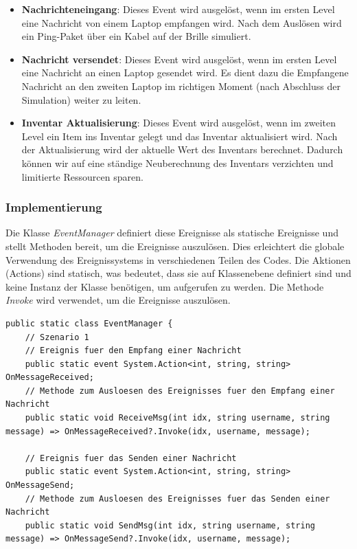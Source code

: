 \begin{itemize}
\begin{itemize}
    \item \textbf{Nachrichteneingang}: Dieses Event wird ausgelöst, wenn im ersten Level eine Nachricht von einem Laptop
    empfangen wird. Nach dem Auslösen wird ein Ping-Paket über ein Kabel auf der Brille simuliert.
    \item \textbf{Nachricht versendet}: Dieses Event wird ausgelöst, wenn im ersten Level eine Nachricht an einen Laptop
    gesendet wird. Es dient dazu die Empfangene Nachricht an den zweiten Laptop im richtigen Moment (nach Abschluss der
    Simulation) weiter zu leiten.
    \item \textbf{Inventar Aktualisierung}: Dieses Event wird ausgelöst, wenn im zweiten Level ein Item ins Inventar gelegt und
    das Inventar aktualisiert wird. Nach der Aktualisierung wird der aktuelle Wert des Inventars berechnet. Dadurch können
    wir auf eine ständige Neuberechnung des Inventars verzichten und limitierte Ressourcen sparen.
\end{itemize}

\subsubsection*{Implementierung}

Die Klasse \textit{EventManager} definiert diese Ereignisse als statische Ereignisse und stellt Methoden bereit, um die
Ereignisse auszulösen. Dies erleichtert die globale Verwendung des Ereignissystems in verschiedenen Teilen des Codes.
Die Aktionen (Actions) sind statisch, was bedeutet, dass sie auf Klassenebene definiert sind und keine Instanz der Klasse
benötigen, um aufgerufen zu werden. Die Methode \textit{Invoke} wird verwendet, um die Ereignisse auszulösen.

\begin{lstlisting}[style=csharp, label=code:EventManager]
public static class EventManager {
    // Szenario 1
    // Ereignis fuer den Empfang einer Nachricht
    public static event System.Action<int, string, string> OnMessageReceived;
    // Methode zum Ausloesen des Ereignisses fuer den Empfang einer Nachricht
    public static void ReceiveMsg(int idx, string username, string message) => OnMessageReceived?.Invoke(idx, username, message);

    // Ereignis fuer das Senden einer Nachricht
    public static event System.Action<int, string, string> OnMessageSend;
    // Methode zum Ausloesen des Ereignisses fuer das Senden einer Nachricht
    public static void SendMsg(int idx, string username, string message) => OnMessageSend?.Invoke(idx, username, message);


\end{lstlisting}
\end{itemize}
